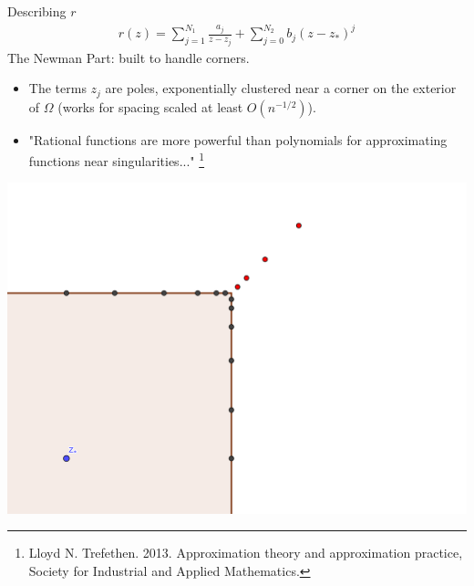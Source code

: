 \documentclass{seminar}
\begin{document}
\begin{slide} %
\large Describing $r$ 
\small
\begin{align*}
r(z)= \sum_{j=1}^{N_1} \frac{a_j}{z-z_j} + \sum_{j=0}^{N_2} b_j (z-z_*)^j
\end{align*}
The Newman Part: built to handle corners.

\begin{multicols}{2}
\begin{itemize}
	\item The terms $z_j$ are poles, exponentially clustered near a corner on the exterior of $\Omega$ (works for spacing scaled at least $O(n^{-1/2})$).
	\item "Rational functions are more powerful than polynomials for approximating functions near singularities..."
	\footnote{Lloyd N. Trefethen. 2013. Approximation theory and approximation practice, Society for Industrial and Applied Mathematics.}
\end{itemize}
\includegraphics[scale=4]{./PNG/corner_nodes_illust}
\end{multicols}
\end{slide} %
\end{document}
